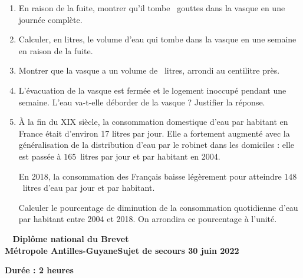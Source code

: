 \documentclass[11pt]{article}
\begin{document}
\begin{enumerate}
\item En raison de la fuite, montrer qu'il tombe ~gouttes dans la vasque en une journée complète.

\item Calculer, en litres, le volume d'eau qui tombe dans la vasque en une semaine en raison de la fuite.

\item  Montrer que la vasque  a un volume de ~litres, arrondi au centilitre près.

\item L'évacuation de la vasque est fermée et le logement inoccupé pendant une semaine. L'eau va-t-elle déborder de la vasque ? Justifier la réponse.
\item  À la fin du XIX\ieme{} siècle, la consommation domestique d'eau par habitant en France était d'environ 17 litres par jour. Elle a fortement augmenté avec la généralisation de la distribution d'eau par le robinet dans les domiciles : elle est passée à $165$~litres par jour et par habitant en 2004.

En 2018, la consommation des Français baisse légèrement pour atteindre $148$~litres d'eau par jour et par habitant.

Calculer le pourcentage de diminution de la consommation quotidienne d'eau par habitant entre 2004 et 2018. On arrondira ce pourcentage à l'unité.
\end{enumerate}
\newpage
\hypertarget{Metropole_secours}{}

\label{Metropole_secours}

\pagestyle{fancy}
\thispagestyle{empty}
\begin{center}
{\Large\textbf{\decofourleft~ Diplôme national du Brevet
 ~\decofourright}}\\[6pt]
{\Large \textbf{Métropole  Antilles-Guyane\hspace{1.5em}Sujet de secours 30 juin 2022}}

\vspace{0,5cm}

\textbf{Durée : 2 heures}
\end{center}
\medskip

\vspace{0,5cm}
\vspace{0.75cm}
\end{document}
